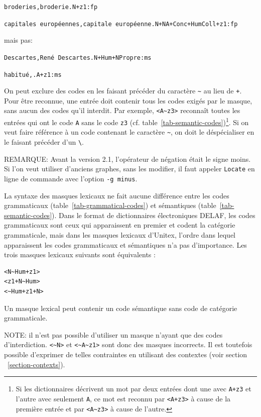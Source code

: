 \bigskip
\noindent
\texttt{broderies,broderie.N+z1:fp}

\noindent
\texttt{capitales europ\'eennes,capitale europ\'eenne.N+NA+Conc+HumColl+z1:fp}

\bigskip
\noindent mais pas:

\bigskip
\noindent
\texttt{Descartes,Ren\'e Descartes.N+Hum+NPropre:ms}

\noindent
\texttt{habitu\'e,.A+z1:ms}

\bigskip
\noindent On peut exclure des codes en les faisant précéder du caractère \verb+~+
au lieu de \verb$+$.\index{\verb+~+}
Pour être reconnue, une entrée doit contenir tous les codes exigés par le
masque, sans aucun des codes qu'il interdit. Par exemple, \verb$<A~z3>$ reconnaît toutes les
entrées qui ont le code \verb+A+ sans le
code \verb+z3+ (cf. table~\ref{tab-semantic-codes})\footnote{Si les dictionnaires décrivent un
mot par deux entrées dont une avec \texttt{A+z3} et l'autre avec seulement \texttt{A}, ce mot est
reconnu par \texttt{<A+z3>} à cause de la première entrée et par
\texttt{<A{\textasciitilde}z3>} à cause de l'autre.}.
Si on veut faire référence à un code
contenant le caractère \verb$~$, on doit le déspécialiser en le faisant précéder d'un \verb+\+.

\bigskip
\noindent REMARQUE: Avant la version 2.1, l'opérateur de négation était le signe moins. Si l'on veut
utiliser d'anciens graphes, sans les modifier, il faut appeler \verb+Locate+ en ligne de commande
avec l'option \verb+-g minus+.

\bigskip
\noindent La syntaxe des masques lexicaux ne fait aucune différence entre les codes grammaticaux
(table~\ref{tab-grammatical-codes}) et sémantiques (table~\ref{tab-semantic-codes}). Dans le
format de dictionnaires électroniques DELAF, les codes grammaticaux sont ceux qui apparaissent
en premier et codent la catégorie grammaticale, mais dans les masques lexicaux d'Unitex, l'ordre
dans lequel apparaissent les codes grammaticaux et sémantiques n'a pas d'importance. Les
trois masques lexicaux suivants sont équivalents :

\begin{verbatim}
<N~Hum+z1>
<z1+N~Hum>
<~Hum+z1+N>
\end{verbatim}

\noindent Un masque lexical peut contenir un code sémantique sans code de catégorie grammaticale.

\bigskip
\noindent NOTE: il n’est pas possible d’utiliser un masque n’ayant que des codes d'interdiction.
\verb+<~N>+ et \verb+<~A~z1>+ sont donc des masques incorrects.
Il est toutefois possible d’exprimer de telles contraintes en utilisant des contextes (voir section
~\ref{section-contexts}).


